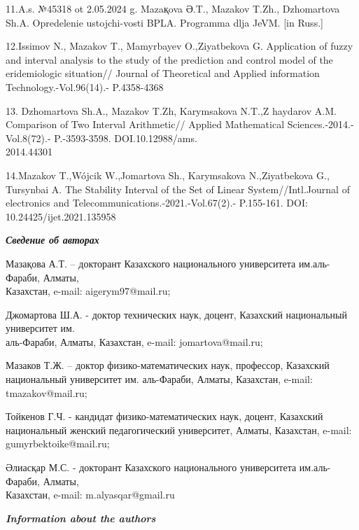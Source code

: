 \begin{noparindent}
11.A.s. №45318 ot 2.05.2024 g. Mazaқova Ә.T., Mazakov T.Zh., Dzhomartova
Sh.A. Opredelenie ustojchi-vosti BPLA. Programma dlja JeVM. {[}in
Russ.{]}

12.Issimov N., Mazakov T., Mamyrbayev O.,Ziyatbekova G. Application of
fuzzy and interval analysis to the study of the prediction and control
model of the eridemiologic situation// Journal of Theoretical and
Applied information Technology.-Vol.96(14).- P.4358-4368

13. Dzhomartova Sh.A., Mazakov T.Zh, Karymsakova N.T.,Z haydarov A.M.
Comparison of Two Interval Arithmetic// Applied Mathematical
Sciences.-2014.-Vol.8(72).- P.-3593-3598. DOI.10.12988/ams.\\2014.44301

14.Mazakov T.,Wójcik W.,Jomartova Sh., Karymsakova N.,Ziyatbekova G.,
Tursynbai A. The Stability Interval of the Set of Linear
System//Intl.Journal of electronics and
Telecommunications.-2021.-Vol.67(2).- P.155-161. DOI:
10.24425/ijet.2021.135958
\end{noparindent}


\emph{{\bfseries Сведение об авторах}}
\begin{noparindent}

Мазақова А.Т. -- докторант Казахского национального университета
им.аль-Фараби, Алматы,\\ Казахстан, e-mail: aigerym97@mail.ru;

Джомартова Ш.А. - доктор технических наук, доцент, Казахский
национальный университет им.\\ аль-Фараби, Алматы, Казахстан, e-mail:
jomartova@mail.ru;

Мазаков Т.Ж. -- доктор физико-математических наук, профессор, Казахский
национальный университет им. аль-Фараби, Алматы, Казахстан, e-mail:
tmazakov@mail.ru;

Тойкенов Г.Ч. - кандидат физико-математических наук, доцент, Казахский
национальный женский педагогический университет, Алматы, Казахстан,
e-mail: gumyrbektoike@mail.ru;

Әлиасқар М.С. - докторант Казахского национального университета
им.аль-Фараби, Алматы, \\Казахстан, e-mail: m.alyasqar@gmail.ru
\end{noparindent}
 
\emph{{\bfseries Information about the authors}}


